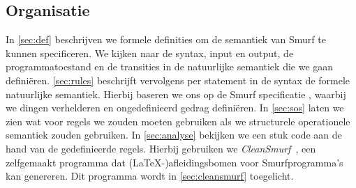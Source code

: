 \subsection{Organisatie} %

In \autoref{sec:def} beschrijven we formele definities om de semantiek van
Smurf te kunnen specificeren. We kijken naar de syntax, input en output, de
programmatoestand en de transities in de natuurlijke semantiek die we gaan
definiëren. \autoref{sec:rules} beschrijft vervolgens per statement in de
syntax de formele natuurlijke semantiek. Hierbij baseren we ons op de Smurf
specificatie \cite{safalra}, waarbij we dingen verhelderen en ongedefinieerd
gedrag definiëren. In \autoref{sec:sos} laten we zien wat voor regels we zouden
moeten gebruiken als we structurele operationele semantiek zouden gebruiken. In
\autoref{sec:analyse} bekijken we een stuk code aan de hand van de
gedefinieerde regels. Hierbij gebruiken we \emph{CleanSmurf}~\cite{cleansmurf},
een zelfgemaakt programma dat (\LaTeX-)afleidingsbomen voor Smurfprogramma's
kan genereren. Dit programma wordt in \autoref{sec:cleansmurf} toegelicht.
